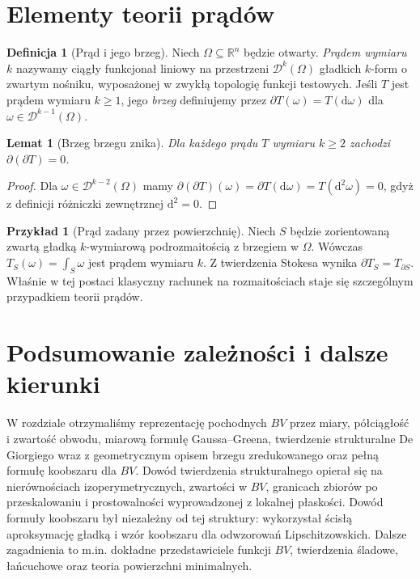 \documentclass[11pt,a4paper,oneside]{book}
\numberwithin{equation}{chapter}
\theoremstyle{plain}
\newtheorem{lemat}[twierdzenie]{Lemat}
\theoremstyle{definition}
\newtheorem{definicja}[twierdzenie]{Definicja}
\newtheorem{przyklad}[twierdzenie]{Przykład}
\theoremstyle{remark}
\begin{document}
\section{Elementy teorii prądów}
\begin{definicja}[Prąd i jego brzeg]
\label{def:current-29}
Niech $\Omega\subseteq\mathbb R^n$ będzie otwarty.
\emph{Prądem wymiaru $k$} nazywamy ciągły
funkcjonał liniowy na przestrzeni $\mathcal D^k(\Omega)$
gładkich $k$-form o zwartym nośniku, wyposażonej
w zwykłą topologię funkcji testowych.
Jeśli $T$ jest prądem wymiaru $k\ge1$, jego
\emph{brzeg} definiujemy przez
$\partial T(\omega)=T(\mathrm d\omega)$
dla $\omega\in\mathcal D^{k-1}(\Omega)$.
\end{definicja}

\begin{lemat}[Brzeg brzegu znika]
\label{lem:current-boundary-square-29}
Dla każdego prądu $T$ wymiaru $k\ge2$ zachodzi
$\partial(\partial T)=0$.
\end{lemat}
\begin{proof}
Dla $\omega\in\mathcal D^{k-2}(\Omega)$ mamy
$\partial(\partial T)(\omega)=
\partial T(\mathrm d\omega)=T(\mathrm d^2\omega)=0$,
gdyż z definicji różniczki zewnętrznej
$\mathrm d^2=0$.
\end{proof}

\begin{przyklad}[Prąd zadany przez powierzchnię]
Niech $S$ będzie zorientowaną zwartą gładką
$k$-wymiarową podrozmaitością z brzegiem
w $\Omega$. Wówczas $T_S(\omega)=\int_S\omega$
jest prądem wymiaru $k$. Z twierdzenia Stokesa
wynika $\partial T_S=T_{\partial S}$. Właśnie
w tej postaci klasyczny rachunek na rozmaitościach
staje się szczególnym przypadkiem teorii prądów.
\end{przyklad}

\section{Podsumowanie zależności i dalsze kierunki}
W rozdziale otrzymaliśmy reprezentację pochodnych
$BV$ przez miary, półciągłość i zwartość obwodu,
miarową formułę Gaussa--Greena, twierdzenie strukturalne
De Giorgiego wraz z geometrycznym opisem brzegu
zredukowanego oraz pełną formułę koobszaru dla $BV$.
Dowód twierdzenia strukturalnego opierał się na
nierównościach izoperymetrycznych, zwartości w $BV$,
granicach zbiorów po przeskalowaniu i prostowalności
wyprowadzonej z lokalnej płaskości.
Dowód formuły koobszaru był niezależny od
tej struktury: wykorzystał ścisłą aproksymację
gładką i wzór koobszaru dla odwzorowań Lipschitzowskich.
Dalsze zagadnienia to m.in. dokładne przedstawiciele
funkcji $BV$, twierdzenia śladowe, łańcuchowe
oraz teoria powierzchni minimalnych.
\end{document}
